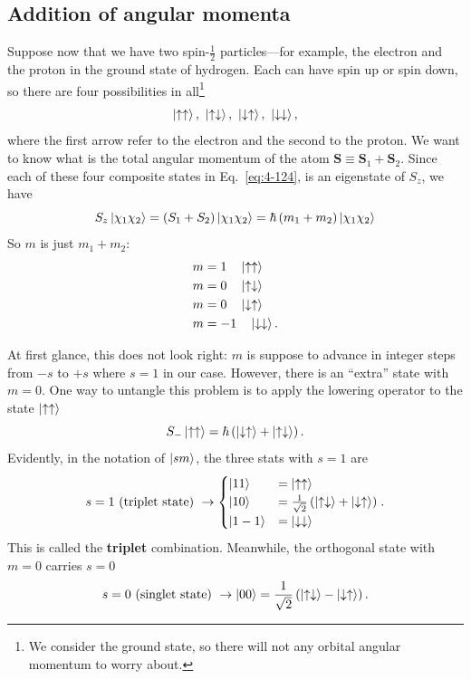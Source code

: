 \subsection{Addition of angular momenta}
Suppose now that we have two spin-$\frac{1}{2}$ particles---for example, the electron and the proton in the ground state of hydrogen.
Each can have spin up or spin down, so there are four possibilities in all\footnote{We consider the ground state, so there  will not any orbital angular momentum to worry about.}
\begin{equation}
  \label{eq:4-124}
 \ket{\uparrow \uparrow}, ~ \ket{\uparrow \downarrow},~ \ket{\downarrow \uparrow}, ~ \ket{\downarrow \downarrow},
\end{equation}
where the first arrow refer to the electron and the second to the proton.
We want to know what is the total angular momentum of the atom $\mathbf{S} \equiv \mathbf{S}_1 + \mathbf{S}_{2}$.
Since each of these four composite states in Eq.~\eqref{eq:4-124}, is an eigenstate of $S_z$, we have
\begin{equation*}
  S_z\ket{\chi_1 \chi_2} = \left( S_1 + S_2 \right) \ket{\chi_1 \chi_2} = \hbar \left( m_1 + m_2 \right) \ket{\chi_1 \chi_2}
\end{equation*}
So $m$ is just $m_1+m_2$:
\begin{align*}
  m &=1 ~ ~ ~ \ket{\uparrow \uparrow}\\
  m &=0 ~ ~ ~ \ket{\uparrow \downarrow}\\
  m &=0 ~ ~ ~ \ket{\downarrow \uparrow}\\
  m &=-1 ~ ~ ~ \ket{\downarrow \downarrow}.
\end{align*}

At first glance, this does not look right: $m$ is suppose to advance in integer steps from $-s$ to $+s$ where $s=1$ in our case.
However, there is an ``extra'' state with $m=0$.
One way to untangle this problem is to apply the lowering operator to the state $\ket{\uparrow \uparrow}$
\begin{equation*}
  S_- \ket{\uparrow \uparrow} = \hbar \left( \ket{\downarrow \uparrow} + \ket{\uparrow \downarrow} \right).
\end{equation*}
Evidently, in the notation of $\ket{sm}$, the three stats with $s=1$ are
\begin{equation}
  \label{eq:4-125}
  s = 1 ~ \text{(triplet state)} ~ \to
  \begin{cases}
    \ket{11} &= \ket{\uparrow \uparrow} \\
    \ket{10} &= \frac{1}{\sqrt{2}} \left( \ket{\uparrow \downarrow} + \ket{\downarrow \uparrow} \right)\\
    \ket{1-1} &= \ket{\downarrow \downarrow}
  \end{cases}.
\end{equation}
This is called the \textbf{triplet} combination.
Meanwhile, the orthogonal state with $m=0$ carries $s=0$
\begin{equation}
  \label{eq:4-126}
  s = 0 ~ \text{(singlet state)} ~ \to \ket{00} = \frac{1}{\sqrt{2}} \left( \ket{\uparrow\downarrow} - \ket{\downarrow \uparrow} \right).
\end{equation}

